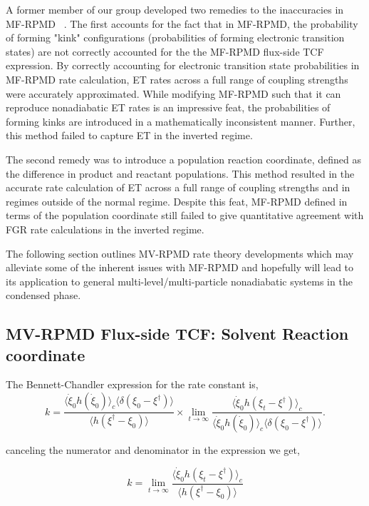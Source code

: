 \documentclass[phd,tocprelim]{cornell}
\begin{document}
A former member of our group developed two remedies to the inaccuracies in MF-RPMD ~\cite{JD2016}. The first accounts for the fact that in MF-RPMD, the probability of forming "kink" configurations (probabilities of forming electronic transition states) are not correctly accounted for the the MF-RPMD flux-side TCF expression. By correctly accounting for electronic transition state probabilities in MF-RPMD rate calculation, ET rates across a full range of coupling strengths were accurately approximated. While modifying MF-RPMD such that it can reproduce nonadiabatic ET rates is an impressive feat, the probabilities of forming kinks are introduced in a mathematically inconsistent manner. Further, this method failed to capture ET in the inverted regime. 

The second remedy was to introduce a population reaction coordinate, defined as the difference in product and reactant populations. This method resulted in the accurate rate calculation of ET across a full range of coupling strengths and in regimes outside of the normal regime. Despite this feat, MF-RPMD defined in terms of the population coordinate still failed to give quantitative agreement with FGR rate calculations in the inverted regime. 

The following section outlines MV-RPMD rate theory developments which may alleviate some of the inherent issues with MF-RPMD and hopefully will lead to its application to general multi-level/multi-particle nonadiabatic systems in the condensed phase. 

 \subsection{MV-RPMD Flux-side TCF: Solvent Reaction coordinate}
The Bennett-Chandler expression for the rate constant is,
\begin{equation}
k= \frac{\langle \dot{\xi}_0  h(\dot{\xi}_0) \rangle_c \langle \delta (\xi_0 -\xi^{\dagger})\rangle}{\langle h(\xi^{\dagger} -\xi_0)\rangle} \times \lim_{t \to \infty} \frac{\langle \dot{\xi}_0 h(\xi_t -\xi^{\dagger}) \rangle_c}{\langle \dot{\xi}_0  h(\dot{\xi}_0) \rangle_c \langle \delta (\xi_0 -\xi^{\dagger})\rangle}.
\end{equation}

canceling the numerator and denominator in the expression we get, 

\begin{equation}
k= \lim_{t \to \infty}\frac{\langle \dot{\xi}_0 h(\xi_t -\xi^{\dagger}) \rangle_c}{\langle h(\xi^{\dagger} -\xi_0)\rangle} 
\end{equation}
\end{document}
